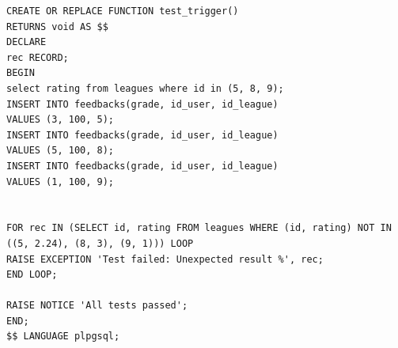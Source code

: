 \begin{lstlisting}[caption={Реализация тестирования для триггера auto\_cal\_rating}, label={lst:test2}]
CREATE OR REPLACE FUNCTION test_trigger()
RETURNS void AS $$
DECLARE
rec RECORD;
BEGIN
select rating from leagues where id in (5, 8, 9);
INSERT INTO feedbacks(grade, id_user, id_league) 
VALUES (3, 100, 5);
INSERT INTO feedbacks(grade, id_user, id_league) 
VALUES (5, 100, 8);
INSERT INTO feedbacks(grade, id_user, id_league) 
VALUES (1, 100, 9);


FOR rec IN (SELECT id, rating FROM leagues WHERE (id, rating) NOT IN ((5, 2.24), (8, 3), (9, 1))) LOOP
RAISE EXCEPTION 'Test failed: Unexpected result %', rec;
END LOOP;

RAISE NOTICE 'All tests passed';
END;
$$ LANGUAGE plpgsql;
\end{lstlisting}